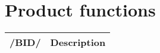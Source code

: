 \chapter{Product functions}
\begin{tabular}{|l | l|}
   \hline
  /BID/ & Description \\
   \hline
\end{tabular}
